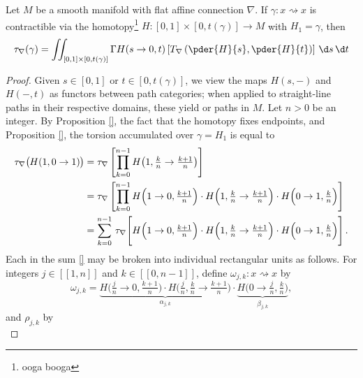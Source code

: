 \begin{theorem}
  Let $M$ be a smooth manifold with flat affine connection $\nabla$. If $\gamma \colon x \rightsquigarrow x$ is contractible via the homotopy\footnote{ooga booga} $H \colon [0, 1] \times [0, t(\gamma)] \to M$ with $H_1 = \gamma$, then 
  \begin{equation}
    \tau_\nabla (\gamma) = \iint_{[0, 1] \times [0, t(\gamma)]} \Gamma H (s \to 0, t) \left[ T_\nabla \left(\pder{H}{s}, \pder{H}{t}\right) \right] \, \d s\, \d t 
  \end{equation}
\end{theorem}
\begin{proof}
  Given $s \in [0, 1]$ or $t \in [0, t(\gamma)]$, we view the maps $H(s, -)$ and $H(-, t)$ as functors between path categories; when applied to straight-line paths in their respective domains, these yield  or  paths in $M$. Let $n > 0$ be an integer. By Proposition \ref{}, the fact that the homotopy fixes endpoints, and Proposition \ref{}, the torsion accumulated over $\gamma = H_1$ is equal to 
  \begin{align}
  \tau_\nabla \big(\hspace{-0.5pt}H(1, 0 \to 1)\hspace{-0.5pt}\big) 
  &= \tau_\nabla \left[\prod_{k = 0}^{n-1} H\big(1, \tfrac{k}{n} \to \tfrac{k + 1}{n}\big)\right] \\
  &= \tau_\nabla \left[\prod_{k = 0}^{n-1} H\Big(1 \to 0, \tfrac{k+1}{n}\Big) \cdot  H\Big(1, \tfrac{k}{n} \to \tfrac{k + 1}{n}\Big) \cdot H\Big(0 \to 1, \tfrac{k}{n}\Big)\right] \\
  &= \sum_{k=0}^{n- 1} \,\tau_\nabla \! \left[\vphantom{\prod^{n-1}}H\Big(1 \to 0, \tfrac{k+1}{n}\Big) \cdot  H\Big(1, \tfrac{k}{n} \to \tfrac{k + 1}{n}\Big) \cdot H\Big(0 \to 1, \tfrac{k}{n}\Big)\right].
  \end{align}
  Each  in the sum \ref{} may be broken into individual rectangular units as follows. For integers $j \in [\![1, n]\!]$ and $k \in [\![0, n - 1]\!]$, define  $ \omega_{j, k} \colon x \rightsquigarrow x$ by
  \begin{equation}
   \omega_{j, k} = \underbrace{H\Big(\tfrac{j}{n} \to 0, \tfrac{k+1}{n}\Big) \cdot  H\Big(\tfrac{j}{n}, \tfrac{k}{n} \to \tfrac{k + 1}{n}\Big)}_{\alpha_{j, k}} \cdot \underbrace{H\Big(0 \to \tfrac{j}{n}, \tfrac{k}{n}\Big)}_{\beta_{j, k}},
  \end{equation}
  and  $\rho_{j,k}$ by 
  \begin{equation}

\end{equation}
\end{proof}
